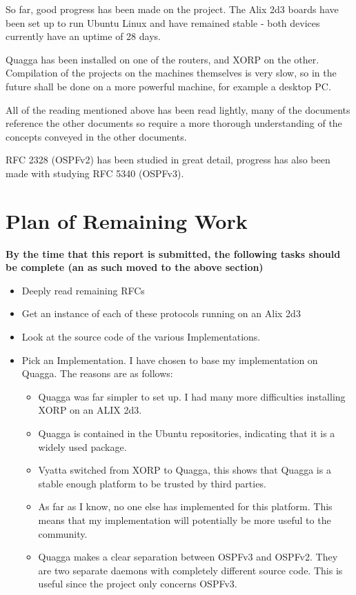 \documentclass[12pt]{report}
\begin{document}
So far, good progress has been made on the project.  The Alix 2d3 boards have
been set up to run Ubuntu Linux and have remained stable - both devices
currently have an uptime of 28 days.

Quagga has been installed on one of the routers, and XORP on the other.
Compilation of the projects on the machines themselves is very slow, so in the
future shall be done on a more powerful machine, for example a desktop PC.

All of the reading mentioned above has been read lightly, many of the documents
reference the other documents so require a more thorough understanding of the
concepts conveyed in the other documents.

RFC 2328 (OSPFv2) has been studied in great detail, progress has also been made
with studying RFC 5340 (OSPFv3). 

\chapter{Plan of Remaining Work}

\em

\textbf{
	By the time that this report is submitted, the following tasks should be
	complete (an as such moved to the above section) 
}

\begin{itemize}

\item Deeply read remaining RFCs
\item Get an instance of each of these protocols running on an Alix 2d3
\item Look at the source code of the various Implementations. 
\item Pick an Implementation. I have chosen to base my implementation on Quagga.
The reasons are as follows: 

\begin{itemize}
\item Quagga was far simpler to set up. I had many more difficulties installing
XORP on an ALIX 2d3.
\item Quagga is contained in the Ubuntu repositories, indicating that it is a
widely used package. 
\item Vyatta switched from XORP to Quagga, this shows that Quagga is a stable
enough platform to be trusted by third parties. 
\item As far as I know, no one else has implemented for this platform. This means
that my implementation will potentially be more useful to the community. 
\item Quagga makes a clear separation between OSPFv3 and OSPFv2. They are two
separate daemons with completely different source code. This is useful since the
project only concerns OSPFv3.
\end{itemize}


\end{itemize}
\end{document}
